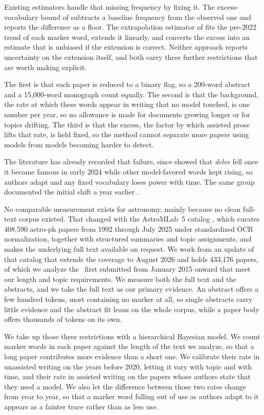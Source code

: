 \documentclass[twocolumn]{aastex631}
\begin{document}
Existing estimators handle that missing frequency by fixing it. The excess-vocabulary bound of \citet{Kobak2024} subtracts a baseline frequency from the observed one and reports the difference as a floor. The extrapolation estimator of \citet{Holzwarth2026} fits the pre-2022 trend of each marker word, extends it linearly, and converts the excess into an estimate that is unbiased if the extension is correct. Neither approach reports uncertainty on the extension itself, and both carry three further restrictions that are worth making explicit.

The first is that each paper is reduced to a binary flag, so a 200-word abstract and a 15{,}000-word monograph count equally. The second is that the background, the rate at which these words appear in writing that no model touched, is one number per year, so no allowance is made for documents growing longer or for topics drifting. The third is that the excess, the factor by which assisted prose lifts that rate, is held fixed, so the method cannot separate more papers using models from models becoming harder to detect.

The literature has already recorded that failure, since \citet{Geng2025} showed that \textit{delve} fell once it became famous in early 2024 while other model-favored words kept rising, so authors adapt and any fixed vocabulary loses power with time. The same group documented the initial shift a year earlier \citep{Geng2024}.

No comparable measurement exists for astronomy, mainly because no clean full-text corpus existed. That changed with the AstroMLab~5 catalog \citep{Ting2025}, which curates 408{,}590 astro-ph papers from 1992 through July 2025 under standardized OCR normalization, together with structured summaries and topic assignments, and makes the underlying full text available on request. We work from an update of that catalog that extends the coverage to August 2026 and holds 433{,}176 papers, of which we analyze the \nFulltext\ first submitted from January 2015 onward that meet our length and topic requirements. We measure both the full text and the abstracts, and we take the full text as our primary evidence. An abstract offers a few hundred tokens, most containing no marker at all, so single abstracts carry little evidence and the abstract fit leans on the whole corpus, while a paper body offers thousands of tokens on its own.

We take up those three restrictions with a hierarchical Bayesian model. We count marker words in each paper against the length of the text we analyze, so that a long paper contributes more evidence than a short one. We calibrate their rate in unassisted writing on the years before 2020, letting it vary with topic and with time, and their rate in assisted writing on the papers whose authors state that they used a model. We also let the difference between those two rates change from year to year, so that a marker word falling out of use as authors adapt to it appears as a fainter trace rather than as less use.
\end{document}
